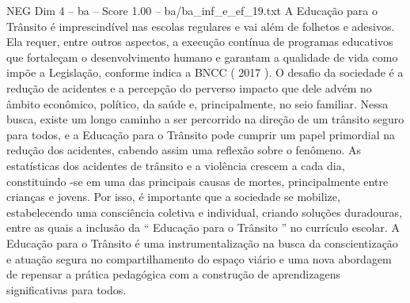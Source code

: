 \begin{textsample}{NEG Dim 4 – ba – Score 1.00 – ba/ba\_inf\_e\_ef\_19.txt}
A Educação para o Trânsito é imprescindível nas escolas regulares e vai além de folhetos e adesivos.
Ela requer, entre outros aspectos, a execução contínua de programas educativos que fortaleçam o desenvolvimento humano e garantam a qualidade de vida como impõe a Legislação, conforme indica a BNCC ( 2017 ).
O desafio da sociedade é a redução de acidentes e a percepção do perverso impacto que dele advém no âmbito econômico, político, da saúde e, principalmente, no seio familiar.
Nessa busca, existe um longo caminho a ser percorrido na direção de um trânsito seguro para todos, e a Educação para o Trânsito pode cumprir um papel primordial na redução dos acidentes, cabendo assim uma reflexão sobre o fenômeno.
As estatísticas dos acidentes de trânsito e a violência crescem a cada dia, constituindo -se em uma das principais causas de mortes, principalmente entre crianças e jovens.
Por isso, é importante que a sociedade se mobilize, estabelecendo uma consciência coletiva e individual, criando soluções duradouras, entre as quais a inclusão da “ Educação para o Trânsito ” no currículo escolar.
A Educação para o Trânsito é uma instrumentalização na busca da conscientização e atuação segura no compartilhamento do espaço viário e uma nova abordagem de repensar a prática pedagógica com a construção de aprendizagens significativas para todos.

\end{textsample}
